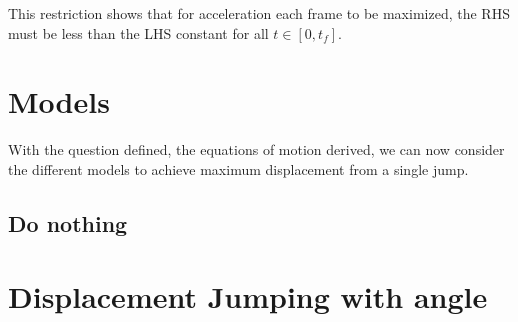 \documentclass[a4paper,11pt]{article}
\begin{document}
This restriction shows that for acceleration each frame to be maximized, the RHS must be less than the LHS constant for all $t \in [0, t_f]$.

\section{Models}
With the question defined, the equations of motion derived, we can now consider the different models to achieve maximum displacement from a single jump.

\subsection{Do nothing}















\section{Displacement Jumping with angle}








\nocite{*}
\newpage
\printbibliography
\end{document}
